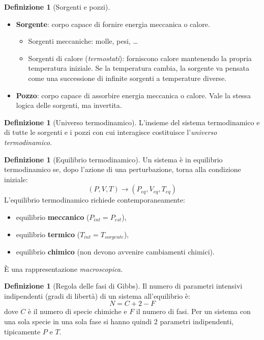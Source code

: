 \documentclass[11pt, a4paper, openright]{book}
\theoremstyle{plain}
\theoremstyle{definition}
\newtheorem{definizione}[teorema]{Definizione}
\theoremstyle{remark}
\begin{document}
\begin{definizione}[Sorgenti e pozzi]
    \begin{itemize}
        \item \textbf{Sorgente}: corpo capace di fornire energia meccanica o calore.
        \begin{itemize}
            \item Sorgenti meccaniche: molle, pesi, \dots
            \item Sorgenti di calore (\emph{termostati}): forniscono calore mantenendo la propria temperatura iniziale. Se la temperatura cambia, la sorgente va pensata come una successione di infinite sorgenti a temperature diverse.
        \end{itemize}
        \item \textbf{Pozzo}: corpo capace di assorbire energia meccanica o calore. Vale la stessa logica delle sorgenti, ma invertita.
    \end{itemize}
\end{definizione}

\begin{definizione}[Universo termodinamico]
    L'insieme del sistema termodinamico e di tutte le sorgenti e i pozzi con cui interagisce costituisce l'\emph{universo termodinamico}.
\end{definizione}

\begin{definizione}[Equilibrio termodinamico]
    Un sistema è in equilibrio termodinamico se, dopo l'azione di una perturbazione, torna alla condizione iniziale:
    \begin{equation}
        (P, V, T) \longrightarrow (P_{eq}, V_{eq}, T_{eq})
    \end{equation}
    L'equilibrio termodinamico richiede contemporaneamente:
    \begin{itemize}
        \item equilibrio \textbf{meccanico} ($P_{int} = P_{est}$),
        \item equilibrio \textbf{termico} ($T_{int} = T_{sorgente}$),
        \item equilibrio \textbf{chimico} (non devono avvenire cambiamenti chimici).
    \end{itemize}
    È una rappresentazione \emph{macroscopica}.
\end{definizione}

\begin{definizione}[Regola delle fasi di Gibbs]
    Il numero di parametri intensivi indipendenti (gradi di libertà) di un sistema all'equilibrio è:
    \begin{equation}
        N = C + 2 - F
    \end{equation}
    dove $C$ è il numero di specie chimiche e $F$ il numero di fasi. Per un sistema con una sola specie in una sola fase si hanno quindi 2 parametri indipendenti, tipicamente $P$ e $T$.
\end{definizione}
\end{document}

